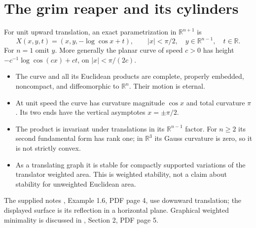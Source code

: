 \chapter{The grim reaper and its cylinders}\label{sec:catalogue-grim-reaper}
\begin{example}\label{ex:catalogue-grim-reaper}
For unit upward translation, an exact parametrization in $\mathbb R^{n+1}$ is
\[
 X(x,y,t)=(x,y,-\log\cos x+t),\qquad |x|<\pi/2,\quad y\in\mathbb R^{n-1},\quad t\in\mathbb R.
\]
For $n=1$ omit $y$. More generally the planar curve of speed $c>0$ has height $-c^{-1}\log\cos(cx)+ct$, on $|x|<\pi/(2c)$.
\begin{itemize}
\item The curve and all its Euclidean products are complete, properly embedded, noncompact, and diffeomorphic to $\mathbb R^n$. Their motion is eternal.
\item At unit speed the curve has curvature magnitude $\cos x$ and total curvature $\pi$. Its two ends have the vertical asymptotes $x=\pm\pi/2$.
\item The product is invariant under translations in its $\mathbb R^{n-1}$ factor. For $n\geq2$ its second fundamental form has rank one; in $\mathbb R^3$ its Gauss curvature is zero, so it is not strictly convex.
\item As a translating graph it is stable for compactly supported variations of the translator weighted area. This is weighted stability, not a claim about stability for unweighted Euclidean area.
\end{itemize}
The supplied notes \cite{CatHIMWNotes19}, Example 1.6, PDF page 4, use downward translation; the displayed surface is its reflection in a horizontal plane. Graphical weighted minimality is discussed in \cite{CatHIMWGraphical18}, Section 2, PDF page 5.
\end{example}


